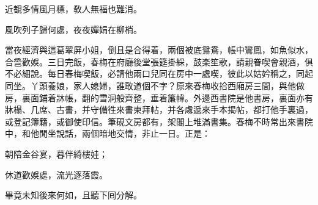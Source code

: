 \begin{myquote}
近覩多情風月標，敎人無福也難消。

風吹列子歸何處，夜夜嬋娟在柳梢。
\end{myquote}

當夜經濟與這葛翠屏小姐，倒且是合得着，兩個被底鴛鴦，帳中鸞鳳，如魚似水，合巹歡娛。三日完飯，春梅在府廳後堂張筵掛綵，鼓楽笙歌，請親眷喫會親酒，俱不必細說。每日春梅喫飯，必請他兩口兒同在房中一處喫，彼此以姑妗稱之，同起同坐。丫頭養娘，家人媳婦，誰敢道個不字？原來春梅收拾西廂房三間，與他做房，裏面鋪着牀帳，翻的雪洞般齊整，垂着簾幃。外邊西書院是他書房，裏面亦有牀榻、几席、古書，并守備徃來書柬拜帖，并各䖏遞來手本揭帖，都打他手裏過，或登記簿籍，或御使印信。筆硯文房都有，架閣上堆滿書集。春梅不時常出來書院中，和他閒坐說話，兩個暗地交情，非止一日。正是：

\begin{myquote}
朝陪金谷宴，暮伴綺樓娃；

休道歡娛處，流光逐落霞。
\end{myquote}

畢竟未知後來何如，且聽下囘分解。

